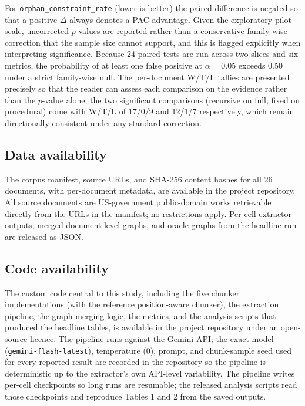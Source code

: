 \documentclass[fleqn,10pt]{wlscirep}
\begin{document}
For \texttt{orphan\_constraint\_rate} (lower is better) the paired
difference is negated so that a positive $\Delta$ always denotes a PAC
advantage. Given the exploratory pilot scale, uncorrected $p$-values
are reported rather than a conservative family-wise correction that
the sample size cannot support, and this is flagged explicitly when
interpreting significance. Because 24 paired tests are run across two
slices and six metrics, the probability of at least one false positive
at $\alpha = 0.05$ exceeds 0.50 under a strict family-wise null. The
per-document W/T/L tallies are presented precisely so that the reader
can assess each comparison on the evidence rather than the $p$-value
alone; the two significant comparisons (recursive on full, fixed on
procedural) come with W/T/L of 17/0/9 and 12/1/7 respectively, which
remain directionally consistent under any standard correction.

\subsection*{Data availability}

The corpus manifest, source URLs, and SHA-256 content hashes for all 26
documents, with per-document metadata, are available in the project
repository. All source documents are US-government public-domain works
retrievable directly from the URLs in the manifest; no restrictions
apply. Per-cell extractor outputs, merged document-level graphs, and
oracle graphs from the headline run are released as JSON.

\subsection*{Code availability}

The custom code central to this study, including the five chunker
implementations (with the reference position-aware chunker), the
extraction pipeline, the graph-merging logic, the metrics, and the
analysis scripts that produced the headline tables, is available in the
project repository under an open-source licence. The pipeline runs
against the Gemini API; the exact model
(\texttt{gemini-flash-latest}), temperature (0), prompt, and
chunk-sample seed used for every reported result are recorded in the
repository so the pipeline is deterministic up to the extractor's own
API-level variability. The pipeline writes per-cell checkpoints so
long runs are resumable; the released analysis scripts read those
checkpoints and reproduce Tables 1 and 2 from the saved outputs.
\end{document}
